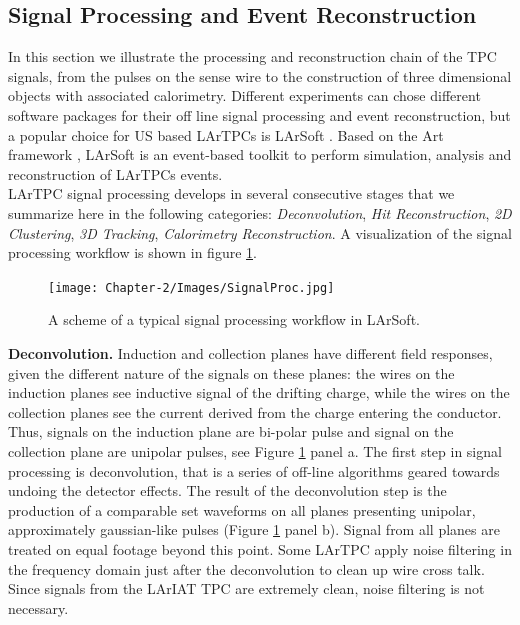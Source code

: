 \subsection{Signal Processing and Event Reconstruction}\label{sec:SignalProc}
In this section we illustrate the processing and reconstruction chain of the TPC signals, from the pulses on the sense wire to the construction of three dimensional objects with associated calorimetry. Different experiments can chose different software packages for their off line signal processing and event reconstruction, but  a popular choice for  US based  LArTPCs is LArSoft \cite{EricFChurck}. Based on the Art framework \cite{Green:2012gv}, LArSoft is an event-based toolkit to perform simulation, analysis and reconstruction of LArTPCs events.\\

LArTPC signal processing develops in several consecutive stages that we summarize here in the following categories: \emph{Deconvolution}, \emph{Hit Reconstruction}, \emph{2D Clustering}, \emph{3D Tracking}, \emph{Calorimetry Reconstruction}.  A visualization of the signal processing workflow is shown in figure \ref{fig:SignalProc}.\\

\begin{figure}[hbpt]
\centering
\texttt{[image: Chapter-2/Images/SignalProc.jpg]}
\caption{A scheme of a typical signal processing workflow in LArSoft.}
\label{fig:SignalProc}
\end{figure}

\textbf{Deconvolution.} Induction and collection planes have different field responses, given the different nature of the signals on these planes: the wires on the induction planes see inductive signal of the drifting charge, while the wires on the collection planes see the current derived from the charge entering the conductor. Thus, signals on the induction plane are bi-polar pulse and signal on the collection plane are unipolar pulses, see Figure \ref{fig:SignalProc} panel a. The first step in signal processing is deconvolution, that is a series of off-line algorithms geared towards undoing the detector effects. The result of the deconvolution step is  the production of  a comparable set waveforms on all planes presenting unipolar, approximately gaussian-like pulses (Figure \ref{fig:SignalProc} panel b). Signal from all planes are treated on equal footage beyond this point. Some LArTPC apply noise filtering in the frequency domain just after the deconvolution to clean up wire cross talk. Since signals from the LArIAT TPC are extremely clean, noise filtering is not necessary.\\


